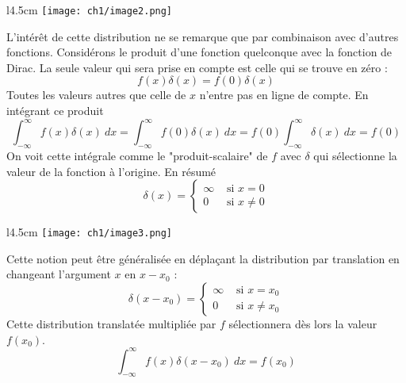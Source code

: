 \begin{wrapfigure}[7]{l}{4.5cm}
\vspace{-17mm}
\texttt{[image: ch1/image2.png]}
\end{wrapfigure}
L'intérêt de cette distribution ne se remarque que par combinaison avec d'autres 
fonctions. Considérons le produit d'une fonction quelconque avec la fonction de 
Dirac. La seule valeur qui sera prise en compte est celle qui se trouve en zéro :
\begin{equation}
f(x)\delta(x) = f(0)\delta(x)
\end{equation}
Toutes les valeurs autres que celle de $x$ n'entre pas en ligne de compte. En 
intégrant ce produit 
\begin{equation}
\int_{-\infty}^{\infty} f(x)\delta(x)\ dx = \int_{-\infty}^\infty f(0)\delta(x)\ dx
= f(0)\int_{-\infty}^{\infty}\delta(x)\ dx = f(0)
\end{equation}
On voit cette intégrale comme le "produit-scalaire" de $f$ avec $\delta$ qui 
sélectionne la valeur de la fonction à l'origine. En résumé
\begin{equation}
\delta(x) = \left\{\begin{array}{ll}
\infty & \text{ si } x = 0\\
0 & \text{ si } x \neq 0
\end{array} \right.
\end{equation}

\begin{wrapfigure}[7]{l}{4.5cm}
\vspace{-13mm}
\texttt{[image: ch1/image3.png]}
\end{wrapfigure}
Cette notion peut être généralisée en déplaçant la distribution par translation en 
changeant l'argument $x$ en $x-x_0$ :
\begin{equation}
\delta(x-x_0) = \left\{\begin{array}{ll}
\infty & \text{ si } x=x_0\\
0 & \text{ si } x\neq x_0 
\end{array} \right.
\end{equation}
Cette distribution translatée multipliée par $f$ sélectionnera dès lors la valeur $f(x_0)$. \\

\begin{equation}
\int_{-\infty}^{\infty} f(x)\delta(x-x_0)\ dx = f(x_0)
\end{equation}

